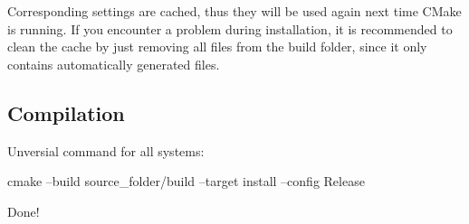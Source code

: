 Corresponding settings are cached, thus they will be used again next time CMake is running.
If you encounter a problem during installation, it is recommended to clean the cache by just removing all files from the build folder, since it only contains automatically generated files. 


\subsection{Compilation}
Unversial command for all systems:
\begin{listing}[mybash]
cmake --build {source_folder}/build --target install --config Release
\end{listing}
Done!
